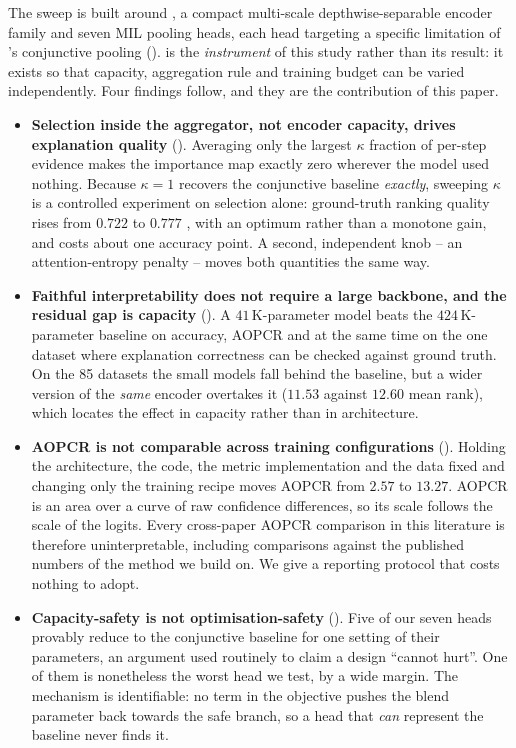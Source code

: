 The sweep is built around \seanet{}, a compact multi-scale depthwise-separable encoder family and
seven MIL pooling heads, each head targeting a specific limitation of \millet{}'s conjunctive
pooling (). \seanet{} is the \emph{instrument} of this study rather than its
result: it exists so that capacity, aggregation rule and training budget can be varied
independently. Four findings follow, and they are the contribution of this paper.

\begin{itemize}
  \item \textbf{Selection inside the aggregator, not encoder capacity, drives explanation quality}
        (). Averaging only the largest $\kappa$ fraction of per-step evidence
        makes the importance map exactly zero wherever the model used nothing. Because
        $\kappa = 1$ recovers the conjunctive baseline \emph{exactly}, sweeping $\kappa$ is a
        controlled experiment on selection alone: ground-truth ranking quality rises from $0.722$ to
        $0.777$ \ndcg{}, with an optimum rather than a monotone gain, and costs about one accuracy
        point. A second, independent knob -- an attention-entropy penalty -- moves both quantities
        the same way.

  \item \textbf{Faithful interpretability does not require a large backbone, and the residual gap is
        capacity} (). A $41$\,K-parameter model beats the $424$\,K-parameter
        baseline on accuracy, AOPCR and \ndcg{} at the same time on the one dataset where
        explanation correctness can be checked against ground truth. On the 85 \ucr{} datasets the
        small models fall behind the baseline, but a wider version of the \emph{same} encoder
        overtakes it ($11.53$ against $12.60$ mean rank), which locates the effect in capacity
        rather than in architecture.

  \item \textbf{AOPCR is not comparable across training configurations} (). Holding
        the architecture, the code, the metric implementation and the data fixed and changing only
        the training recipe moves AOPCR from $2.57$ to $13.27$. AOPCR is an area over a curve of raw
        confidence differences, so its scale follows the scale of the logits. Every cross-paper
        AOPCR comparison in this literature is therefore uninterpretable, including comparisons
        against the published numbers of the method we build on. We give a reporting protocol that
        costs nothing to adopt.

  \item \textbf{Capacity-safety is not optimisation-safety} (). Five of our seven
        heads provably reduce to the conjunctive baseline for one setting of their parameters, an
        argument used routinely to claim a design ``cannot hurt''. One of them is nonetheless the
        worst head we test, by a wide margin. The mechanism is identifiable: no term in the
        objective pushes the blend parameter back towards the safe branch, so a head that
        \emph{can} represent the baseline never finds it.
\end{itemize}

